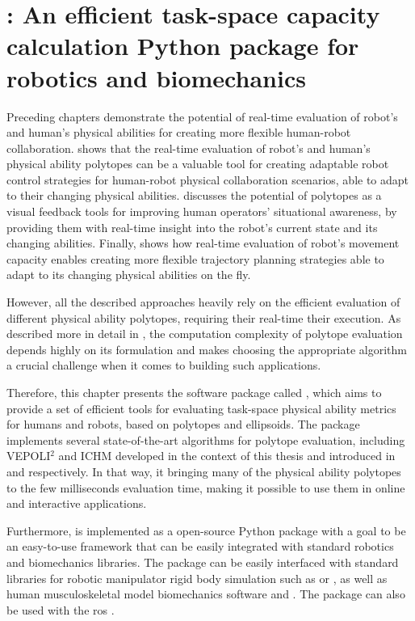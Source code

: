 \chapter{: An efficient task-space capacity calculation Python package for robotics and biomechanics}
\label{ch:software}

Preceding chapters demonstrate the potential of real-time evaluation of robot's and human's physical abilities for creating more flexible human-robot collaboration.  shows that the real-time evaluation of robot's and human's physical ability polytopes can be a valuable tool for creating adaptable robot control strategies for human-robot physical collaboration scenarios, able to adapt to their changing physical abilities.   discusses the potential of polytopes as a visual feedback tools for improving human operators' situational awareness, by providing them with real-time insight into the robot's current state and its changing abilities. Finally,  shows how real-time evaluation of robot's movement capacity enables creating more flexible trajectory planning strategies able to adapt to its changing physical abilities on the fly. 

However, all the described approaches heavily rely on the efficient evaluation of different physical ability polytopes, requiring their 
real-time their execution. As described more in detail in , the computation complexity of polytope evaluation depends highly on its formulation and makes choosing the appropriate algorithm a crucial challenge when it comes to building such applications. 

Therefore, this chapter presents the software package called , which aims to provide a set of efficient tools for evaluating task-space physical ability metrics for humans and robots, based on polytopes and ellipsoids. The package implements several state-of-the-art algorithms for polytope evaluation, including VEPOLI$^2$ and ICHM developed in the context of this thesis and introduced in  and  respectively. In that way, it bringing many of the physical ability polytopes to the few milliseconds evaluation time, making it possible to use them in online and interactive applications. 

Furthermore,  is implemented as a open-source Python package with a goal to be an easy-to-use framework that can be easily integrated with standard robotics and biomechanics libraries. The package can be easily interfaced with standard libraries for robotic manipulator rigid body simulation such as  \cite{rtb} or  \cite{pinocchio2021}, as well as human musculoskeletal model biomechanics software  \cite{opensim} and  \cite{Michaud2021}. The package can also be used with the \gls{ros} \cite{ros}.

